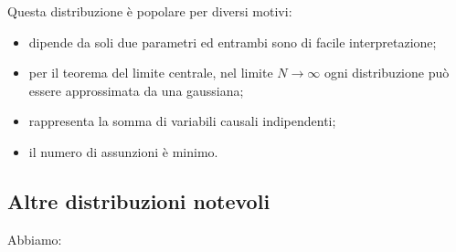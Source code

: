 \documentclass[10pt]{article}
\theoremstyle{definition}
\begin{document}
Questa distribuzione è popolare per diversi motivi:
\begin{itemize}
\item dipende da soli due parametri ed entrambi sono di facile interpretazione;
\item per il teorema del limite centrale, nel limite $N\longrightarrow\infty$ ogni distribuzione può essere approssimata da una gaussiana;
\item rappresenta la somma di variabili causali indipendenti;
\item il numero di assunzioni è minimo.
\end{itemize}

\subsection{Altre distribuzioni notevoli}
Abbiamo:
\end{document}
